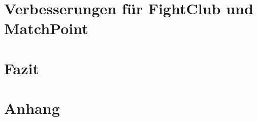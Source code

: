 \documentclass[12pt,a4paper,bibliography=totocnumbered,listof=totocnumbered]{article}
\begin{document}
\section{Verbesserungen für FightClub und MatchPoint}\label{sec:verbesserungen}


\section{Fazit}\label{sec:fazit}


\section{Anhang}\label{sec:anhang}


\renewcommand\refname{Literaturverzeichnis}


\pagebreak
\end{document}
